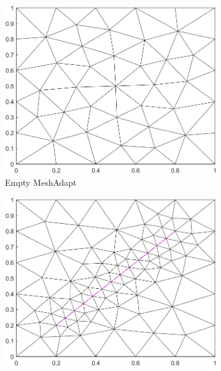 \begin{figure}[ht]
    \centering
    \begin{subfigure}[b]{0.33\textwidth}
        \centering
        \includegraphics[width=\textwidth]{report/Images/Software/Gmsh meshing algorithms/gmsh_meshing_algorithms_meshadapt.png}
        \caption{Empty MeshAdapt}
        \label{fig:Gmsh-MeshAdapt-empty}
    \end{subfigure}
    \begin{subfigure}[b]{0.33\textwidth}
        \centering
        \includegraphics[width=\textwidth]{report/Images/Software/Gmsh meshing algorithms/gmsh_meshing_algorithms_embedded_meshadapt.png}

\end{subfigure}
\end{figure}
